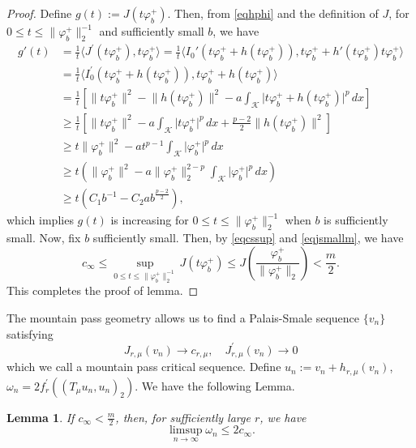 \documentclass[11pt]{amsart}
\newtheorem{lemma}[theorem]{Lemma}
\newcommand{\abs}[1]{\lvert#1\rvert}
\newcommand{\norm}[1]{\lVert#1\rVert}
\newcommand{\K}{\mathcal{K}}
\numberwithin{equation}{section}
\begin{document}
\begin{proof}
Define $g(t):=J(t\varphi_b^+)$. Then, from \eqref{eqhphi} and the definition of $J$, for $0 \leq t \leq\norm{\varphi_b^+}_{2} ^{-1}$ and sufficiently small $b$, we have
$$
\begin{aligned}
g'(t) & =\frac{1}{t}\langle J^{\prime}(t\varphi_b^+), t\varphi_b^+\rangle=\frac{1}{t}\langle I_0'(t\varphi_b^++h(t\varphi_b^+)), t \varphi_b^++h'(t\varphi_b^+) t\varphi_b^+\rangle \\
& =\frac{1}{t}\langle I_0^{\prime}(t\varphi_b^++h(t\varphi_b^+)), t\varphi_b^+ + h(t\varphi_b^+)\rangle \\
& =\frac{1}{t}\left[\norm{t\varphi_b^+}^2-\norm{h(t\varphi_b^+)}^2-a\int_{\K} \abs{t\varphi_b^+ + h(t\varphi_b^+)}^p \,dx\right]\\
& \geq \frac{1}{t}\left[\norm{t\varphi_b^+}^{2}-a\int_{\K}\abs{t\varphi_b^+}^{p}\,dx+\frac{p-2}{2}\norm{h(t\varphi_b^+)}^{2}\right] \\
& \geq t\norm{\varphi_b^+}^2-at^{p-1}\int_{\K} \abs{\varphi_b^+}^{p} \,dx \\
& \geq t\left(\norm{\varphi_b^+}^2-a\norm{\varphi_b^+}_{2}^{2-p}\int_{\K} \abs{\varphi_b^+}^{p} \,dx\right)\\
& \geq t(C_1b^{-1} - C_2ab^\frac{p-2}{2}),
\end{aligned}
$$
which implies $g(t)$ is increasing for $0 \leq t \leq\norm{\varphi_b^+}_{2} ^{-1}$ when $b$ is sufficiently small. Now, fix $b$ sufficiently small. Then, by \eqref{eqcssup} and \eqref{eqjsmallm}, we have
$$
c_{\infty} \leq \sup _{0 \leq t \leq\norm{\varphi_b^+}_{2} ^{-1}} J(t\varphi_b^+) \leq J(\frac{\varphi_b^+}{\norm{\varphi_b^+}_2}) < \frac{m}{2}.
$$
This completes the proof of lemma.
\end{proof}
The mountain pass geometry allows us to find a Palais-Smale sequence $\{v_{n}\}$ satisfying
\begin{equation*}
J_{r, \mu}(v_{n}) \rightarrow c_{r, \mu}, \quad J_{r, \mu}^{\prime}(v_{n}) \rightarrow 0
\end{equation*}
which we call a mountain pass critical sequence. Define $u_{n}:=v_{n}+h_{r, \mu}(v_{n})$, $\omega_{n}=2f_{r}^{\prime}((T_{\mu} u_{n}, u_{n})_{2})$. We have the following Lemma.
\begin{lemma}\label{lemwn}
If $c_\infty < \frac{m}{2}$, then, for sufficiently large $r$, we have
$$
\limsup _{n \rightarrow \infty} \omega_{n} \leq 2 c_{\infty}.
$$
\end{lemma}
\end{document}
